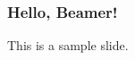 \documentclass{beamer}
\begin{document}
\begin{frame}
    \frametitle{Hello, Beamer!}
    This is a sample slide.
\end{frame}
\end{document}
